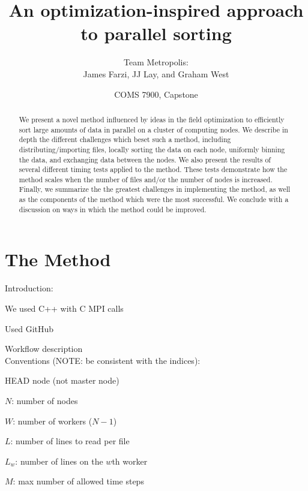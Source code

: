 \documentclass{article}
\begin{document}
\title{An optimization-inspired approach to parallel sorting}
\author{Team Metropolis: \\
		James Farzi, JJ Lay, and Graham West}
\date{COMS 7900, Capstone}

\maketitle

\begin{abstract}
We present a novel method influenced by ideas in the field optimization to efficiently sort large amounts of data in parallel on a cluster of computing nodes. We describe in depth the different challenges which beset such a method, including distributing/importing files, locally sorting the data on each node, uniformly binning the data, and exchanging data between the nodes. We also present the results of several different timing tests applied to the method. These tests demonstrate how the method scales when the number of files and/or the number of nodes is increased. Finally, we summarize the the greatest challenges in implementing the method, as well as the components of the method which were the most successful. We conclude with a discussion on ways in which the method could be improved.
\end{abstract}


\tableofcontents


\section{The Method}

Introduction:

We used C++ with C MPI calls

Used GitHub

Workflow description\\



Conventions (NOTE: be consistent with the indices):

HEAD node (not master node)

$N$: number of nodes

$W$: number of workers ($N-1$)

$L$: number of lines to read per file

$L_w$: number of lines on the $w$th worker

$M$: max number of allowed time steps
\end{document}
